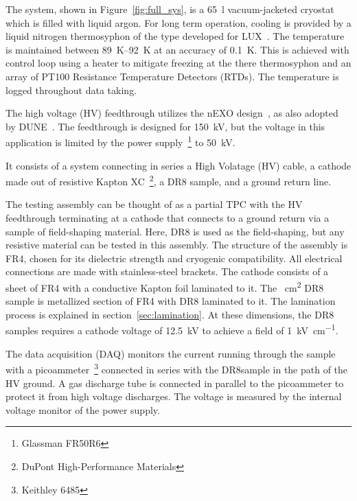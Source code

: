 \documentclass[a4paper,12pt]{article}
\newcommand{\DR}{DR8}
\begin{document}
The system, shown in Figure~\ref{fig:full_sys}, is a \SI{65}{\litre} vacuum-jacketed cryostat which is filled with liquid argon. 
For long term operation, cooling is provided by a liquid nitrogen thermosyphon of the type developed for LUX~\cite{lux}.
The temperature is maintained between \SIrange{89}{92}{\kelvin} at an accuracy of \SI{0.1}{\kelvin}. 
This is achieved with control loop using a heater to mitigate freezing at the there thermosyphon and an array of PT100 Resistance Temperature Detectors (RTDs).
The temperature is logged throughout data taking.   

The high voltage (HV) feedthrough utilizes the nEXO design~\cite{nEXO_pcdr}, as also adopted by DUNE~\cite{DUNE:2021tad}. 
The feedthrough is designed for \SI{150}{\kilo\volt}, but the voltage in this application is limited by the power supply~\footnote{Glassman FR50R6} to \SI{50}{\kilo\volt}. 



It consists of a system connecting in series a High Volatage (HV) cable, a cathode made out of resistive Kapton XC~\footnote{DuPont High-Performance Materials}, a {\DR} sample, and a ground return line. 


The testing assembly can be thought of as a partial TPC with the HV feedthrough terminating at a cathode that connects to a ground return via a sample of field-shaping material. 
Here, {\DR} is used as the field-shaping, but any resistive material can be tested in this assembly.    
The structure of the assembly is FR4, chosen for its dielectric strength and cryogenic compatibility.
All electrical connections are made with stainless-steel brackets. 
The cathode consists of a sheet of FR4 with a conductive Kapton foil laminated to it.   
The ~\unit{\centi\metre\squared} {\DR} sample is metallized section of FR4 with {\DR} laminated to it.
The lamination process is explained in section~\ref{sec:lamination}.
At these dimensions, the {\DR} samples requires a cathode voltage of \SI{12.5}{\kilo\volt} to achieve a field of \SI{1}{\kilo\volt\per\centi\metre}.    

The data acquisition (DAQ) monitors the current running through the sample with a picoammeter~\footnote{Keithley 6485} connected in series with the \DR sample in the path of the HV ground. 
A gas discharge tube is connected in parallel to the picoammeter to protect it from high voltage discharges. 
The voltage is measured by the internal voltage monitor of the power supply.
\end{document}
